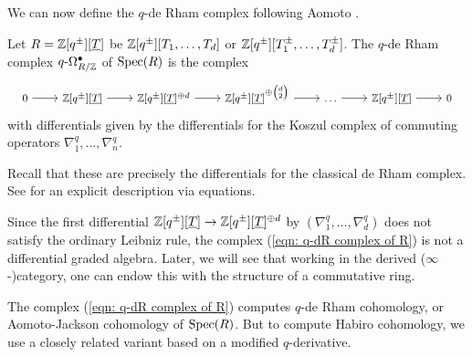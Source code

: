 We can now define the $q$-de Rham complex following Aomoto \cite{Aomoto}. 
\begin{definition}\label{def: q-dR complex}
    Let $R=\mathbb{Z}[q^{\pm}][\underline{T}]$ be $\mathbb{Z}[q^{\pm}][T_{1},\dots,T_{d}]$ or $\mathbb{Z}[q^{\pm}][T_{1}^{\pm},\dots,T_{d}^{\pm}]$. The $q$-de Rham complex $q\text{-}\Omega^{\bullet}_{R/\mathbb{Z}}$ of $\operatorname{Spec}(R)$ is the complex
    \begin{equation}\label{eqn: q-dR complex of R}
    \footnotesize
    \begin{tikzcd}
        0 & {\ZZ[q^{\pm}][\underline{T}]} & {\ZZ[q^{\pm}][\underline{T}]^{\oplus d}} & {\ZZ[q^{\pm}][\underline{T}]^{\oplus\binom{d}{2}}} & \dots & {\ZZ[q^{\pm}][\underline{T}]} & 0
        \arrow[from=1-1, to=1-2]
        \arrow[from=1-2, to=1-3]
        \arrow[from=1-3, to=1-4]
        \arrow[from=1-4, to=1-5]
        \arrow[from=1-5, to=1-6]
        \arrow[from=1-6, to=1-7]
    \end{tikzcd}
    \normalsize
    \end{equation}
    with differentials given by the differentials for the Koszul complex of commuting operators $\nabla_{1}^{q},\dots,\nabla_{n}^{q}$.
\end{definition}
\begin{remark}
    Recall that these are precisely the differentials for the classical de Rham complex. See \cite[\href{https://stacks.math.columbia.edu/tag/0FKF}{Tag 0FKF}]{stacks-project} for an explicit description via equations. 
\end{remark}
\begin{remark}
    Since the first differential $\mathbb{Z}[q^{\pm}][\underline{T}]\to\mathbb{Z}[q^{\pm}][\underline{T}]^{\oplus d}$ by $(\nabla_{1}^{q},\dots,\nabla_{d}^{q})$ does not satisfy the ordinary Leibniz rule, the complex (\ref{eqn: q-dR complex of R}) is not a differential graded algebra. Later, we will see that working in the derived ($\infty$-)category, one can endow this with the structure of a commutative ring.  
\end{remark}
The complex (\ref{eqn: q-dR complex of R}) computes $q$-de Rham cohomology, or Aomoto-Jackson cohomology of $\operatorname{Spec}(R)$. But to compute Habiro cohomology, we use a closely related variant based on a modified $q$-derivative. 
